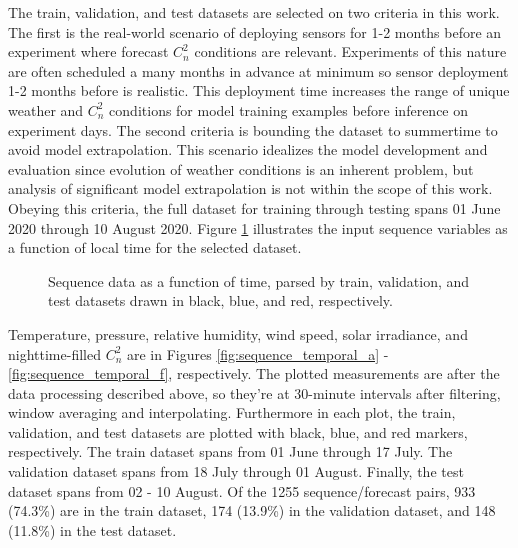 The train, validation, and test datasets are selected on two criteria in this work. The first is the real-world scenario of deploying sensors for 1-2 months before an experiment where forecast $C_{n}^{2}$ conditions are relevant. Experiments of this nature are often scheduled a many months in advance at minimum so sensor deployment 1-2 months before is realistic. This deployment time increases the range of unique weather and $C_{n}^{2}$ conditions for model training examples before inference on experiment days. The second criteria is bounding the dataset to summertime to avoid model extrapolation. This scenario idealizes the model development and evaluation since evolution of weather conditions is an inherent problem, but analysis of significant model extrapolation is not within the scope of this work. Obeying this criteria, the full dataset for training through testing spans 01 June 2020 through 10 August 2020. Figure \ref{fig:sequence_temporal} illustrates the input sequence variables as a function of local time for the selected dataset.
\label{sec:wx_seq_hist}
\begin{figure}[p!]
	\centering
	\hfill
	\hfill
	\hfill
	\caption{Sequence data as a function of time, parsed by train, validation, and test datasets drawn in black, blue, and red, respectively.}
	\label{fig:sequence_temporal}
\end{figure}
Temperature, pressure, relative humidity, wind speed, solar irradiance, and nighttime-filled $C_{n}^{2}$ are in Figures \ref{fig:sequence_temporal_a} - \ref{fig:sequence_temporal_f}, respectively. The plotted measurements are after the data processing described above, so they're at 30-minute intervals after filtering, window averaging and interpolating. Furthermore in each plot, the train, validation, and test datasets are plotted with black, blue, and red markers, respectively. The train dataset spans from 01 June through 17 July. The validation dataset spans from 18 July through 01 August. Finally, the test dataset spans from 02 - 10 August. Of the 1255 sequence/forecast pairs, 933 (74.3\%) are in the train dataset, 174 (13.9\%) in the validation dataset, and 148 (11.8\%) in the test dataset.

